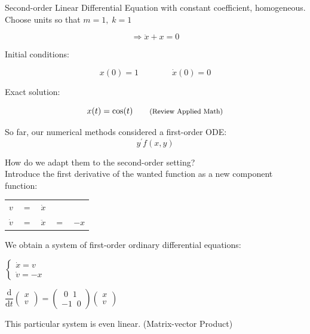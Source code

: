 \documentclass[a4paper,12pt]{report}
\begin{document}
	\noindent Second-order Linear Differential Equation with constant coefficient, homogeneous. Choose units so that $m =1, \; k = 1$
	
	$$ \Rightarrow \ddot{x} + x = 0$$
	
	Initial conditions:
	
	$$ x(0) = 1 \qquad \qquad \dot{x}(0) = 0 $$
	
	Exact solution:
	
	$$ x(t) = \cos(t) \qquad \text{\footnotesize{(Review Applied Math)}}$$
	
	
	So far, our numerical methods considered a first-order ODE:
	$$ y^ \prime f(x,y)$$
	
	How do we adapt them to the second-order setting?\\
	
	Introduce the first derivative of the wanted function as a new component function:
	\begin{center}
	\begin{tabular}{r c c c  l}
		$v$ & $=$ & $\dot{x}$ &&\\
		$\dot{v}$ & $ = $ & $\ddot{x}$ & $= $& $-x$
	\end{tabular}
	\end{center}
	
	We obtain a system of first-order ordinary differential equations:\\
	
	\begin{center}
	$	
  	\left\{
  	\begin{array}{l}
		 \dot{x} = v \\
		\dot{v} = -x
	\end{array}
  	\right.
	$\\
	
	\bigskip
	
	
	$\dfrac{\mathrm{d}}{\mathrm{d}t}
  	\begin{pmatrix}
		x\\
		v
	\end{pmatrix}
	=
	\begin{pmatrix}
	\; 0 \; \; 1 \\
	-1 \; \; 0
	\end{pmatrix}
	\begin{pmatrix}
		x \\
		v
	\end{pmatrix}
	$
	\end{center}
	
	This particular system is even linear. (Matrix-vector Product)
	
\end{document}
